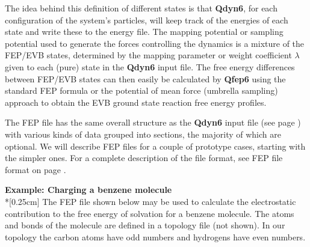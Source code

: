 \documentclass[a4paper,11pt]{article}
\begin{document}
The idea behind this definition of different states is that \textbf{Qdyn6},
for each configuration of the system's particles, will keep track
of the energies of each state and write these to the energy file.
The mapping potential or sampling potential used to generate the
forces controlling the dynamics is a mixture of the FEP/EVB
states, determined by the mapping parameter or weight coefficient
$\lambda $ given to each (pure) state in the \textbf{Qdyn6} input file. The
free energy differences between FEP/EVB states can then easily be
calculated by \textbf{Qfep6} using the standard FEP formula or the potential
of mean force (umbrella sampling) approach to obtain the EVB
ground state reaction free energy profiles.

The FEP file has the same overall structure as the \textbf{Qdyn6} input file
(see page \pageref{subsubsec:prep_qdyn_inp_f}) with various kinds
of data grouped into sections, the majority of which are optional.
We will describe FEP files for a couple of prototype cases,
starting with the simpler ones. For a complete description of the
file format, see FEP file format on page
\pageref{subsubsec:fepfileformat}.

\textbf{Example: Charging a benzene molecule}\\*[0.25cm] The FEP
file shown below may be used to calculate the electrostatic
contribution to the free energy of solvation for a benzene
molecule. The atoms and bonds of the molecule are defined in a
topology file (not shown). In our topology the carbon atoms have
odd numbers and hydrogens have even numbers.
\end{document}
